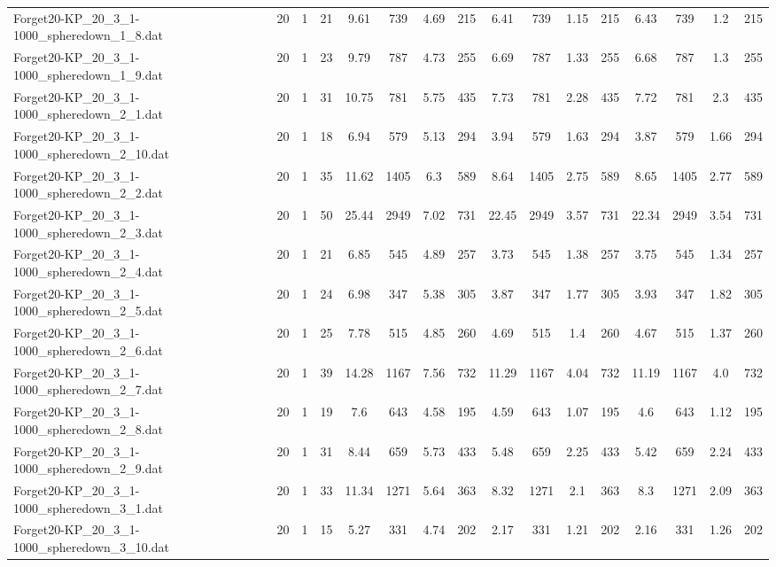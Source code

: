 \begin{sidewaystable}[!ht]
{\begin{tabular}{lccccccccccccccc}
Forget20-KP\_20\_3\_1-1000\_spheredown\_1\_8.dat & 20 & 1 & 21 & 9.61 & 739 & 4.69 & 215 & 6.41 & 739 &  \textcolor{blue2}{1.15} & 215 & 6.43 & 739 & 1.2 & 215 \\
Forget20-KP\_20\_3\_1-1000\_spheredown\_1\_9.dat & 20 & 1 & 23 & 9.79 & 787 & 4.73 & 255 & 6.69 & 787 & 1.33 & 255 & 6.68 & 787 &  \textcolor{blue2}{1.3} & 255 \\
Forget20-KP\_20\_3\_1-1000\_spheredown\_2\_1.dat & 20 & 1 & 31 & 10.75 & 781 & 5.75 & 435 & 7.73 & 781 & 2.28 & 435 & 7.72 & 781 & 2.3 & 435 \\
Forget20-KP\_20\_3\_1-1000\_spheredown\_2\_10.dat & 20 & 1 & 18 & 6.94 & 579 & 5.13 & 294 & 3.94 & 579 & 1.63 & 294 & 3.87 & 579 & 1.66 & 294 \\
Forget20-KP\_20\_3\_1-1000\_spheredown\_2\_2.dat & 20 & 1 & 35 & 11.62 & 1405 & 6.3 & 589 & 8.64 & 1405 & 2.75 & 589 & 8.65 & 1405 & 2.77 & 589 \\
Forget20-KP\_20\_3\_1-1000\_spheredown\_2\_3.dat & 20 & 1 & 50 & 25.44 & 2949 & 7.02 & 731 & 22.45 & 2949 & 3.57 & 731 & 22.34 & 2949 & 3.54 & 731 \\
Forget20-KP\_20\_3\_1-1000\_spheredown\_2\_4.dat & 20 & 1 & 21 & 6.85 & 545 & 4.89 & 257 & 3.73 & 545 & 1.38 & 257 & 3.75 & 545 &  \textcolor{blue2}{1.34} & 257 \\
Forget20-KP\_20\_3\_1-1000\_spheredown\_2\_5.dat & 20 & 1 & 24 & 6.98 & 347 & 5.38 & 305 & 3.87 & 347 & 1.77 & 305 & 3.93 & 347 & 1.82 & 305 \\
Forget20-KP\_20\_3\_1-1000\_spheredown\_2\_6.dat & 20 & 1 & 25 & 7.78 & 515 & 4.85 & 260 & 4.69 & 515 & 1.4 & 260 & 4.67 & 515 &  \textcolor{blue2}{1.37} & 260 \\
Forget20-KP\_20\_3\_1-1000\_spheredown\_2\_7.dat & 20 & 1 & 39 & 14.28 & 1167 & 7.56 & 732 & 11.29 & 1167 & 4.04 & 732 & 11.19 & 1167 & 4.0 & 732 \\
Forget20-KP\_20\_3\_1-1000\_spheredown\_2\_8.dat & 20 & 1 & 19 & 7.6 & 643 & 4.58 & 195 & 4.59 & 643 &  \textcolor{blue2}{1.07} & 195 & 4.6 & 643 & 1.12 & 195 \\
Forget20-KP\_20\_3\_1-1000\_spheredown\_2\_9.dat & 20 & 1 & 31 & 8.44 & 659 & 5.73 & 433 & 5.48 & 659 & 2.25 & 433 & 5.42 & 659 &  \textcolor{blue2}{2.24} & 433 \\
Forget20-KP\_20\_3\_1-1000\_spheredown\_3\_1.dat & 20 & 1 & 33 & 11.34 & 1271 & 5.64 & 363 & 8.32 & 1271 & 2.1 & 363 & 8.3 & 1271 & 2.09 & 363 \\
Forget20-KP\_20\_3\_1-1000\_spheredown\_3\_10.dat & 20 & 1 & 15 & 5.27 & 331 & 4.74 & 202 & 2.17 & 331 &  \textcolor{blue2}{1.21} & 202 & 2.16 & 331 & 1.26 & 202 \\

\end{tabular}}
\end{sidewaystable}
